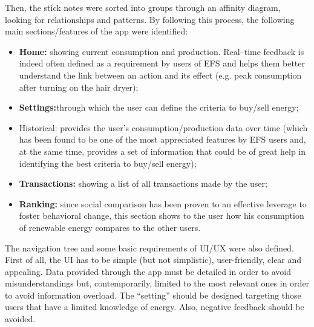 Then, the stick notes were sorted into groups through an affinity diagram, looking for relationships and patterns. By following this process, the following main sections/features of the app were identified:



\begin{itemize}
    \item \textbf{Home:} showing current consumption and production. Real--time feedback is indeed often defined as a requirement by users of EFS and helps them better understand the link between an action and its effect (e.g. peak consumption after turning on the hair dryer);
    \item \textbf{Settings:}through which the user can define the criteria to buy/sell energy;
    \item {Historical:} provides the user’s consumption/production data over time (which has been found to be one of the most appreciated features by EFS users and, at the same time, provides a set of information that could be of great help in identifying the best criteria to buy/sell energy);
    \item \textbf{Transactions:} showing a list of all transactions made by the user;
    \item \textbf{Ranking:} since social comparison has been proven to an effective leverage to foster behavioral change, this section shows to the user how his consumption of renewable energy compares to the other users.
\end{itemize}


The navigation tree and some basic requirements of \ac{UI}/\ac{UX} were also defined. First of all, the \ac{UI} has to be simple (but not simplistic), user-friendly, clear and appealing. Data provided through the app must be detailed in order to avoid misunderstandings but, contemporarily, limited to the most relevant ones in order to avoid information overload. The “setting” should be designed targeting those users that have a limited knowledge of energy. Also, negative feedback should be avoided.


